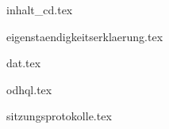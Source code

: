 {inhalt_cd.tex}

{eigenstaendigkeitserklaerung.tex}

{dat.tex}

{odhql.tex}

 \addtocounter{chapter}{1}


{sitzungsprotokolle.tex}